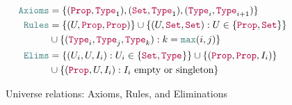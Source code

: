 \begin{figure}
\centering
\begin{align*}
\Axioms
    &= \set{(\Prop, \Type{1}), (\Set, \Type{1}), (\Type{i}, \Type{i+1})} \\
\Rules
    &= \set{(U, \Prop, \Prop)}
    \cup \set{(U, \Set, \Set) : U \in \set{\Prop, \Set}} \\
    &\cup \set{(\Type{i}, \Type{j}, \Type{k}) : k = \meta{max}(i, j)} \\
\Elims
    &= \set{(U_i, U, I_i) : U_i \in \set{\Set, \Type{}}}
    \cup \set{(\Prop, \Prop, I_i)} \\
    &\cup \set{(\Prop, U, I_i) : \text{$I_i$ empty or singleton}}
\end{align*}
\caption{Universe relations: Axioms, Rules, and Eliminations}
\label{fig:axruel}
\end{figure}

